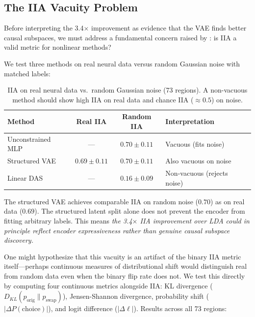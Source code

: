 \documentclass{article}
\begin{document}
\subsection{The IIA Vacuity Problem}
\label{sec:vacuity}

Before interpreting the 3.4$\times$ improvement as evidence that the VAE finds better causal subspaces, we must address a fundamental concern raised by \citet{sutter2025iia}: is IIA a valid metric for nonlinear methods?

We test three methods on real neural data versus random Gaussian noise with matched labels:

\begin{table}[h]
\centering
\small
\caption{IIA on real neural data vs.\ random Gaussian noise (73 regions). A non-vacuous method should show high IIA on real data and chance IIA ($\approx 0.5$) on noise.}
\label{tab:sutter}
\begin{tabular}{lccl}
\toprule
Method & Real IIA & Random IIA & Interpretation \\
\midrule
Unconstrained MLP & --- & $0.70 \pm 0.11$ & Vacuous (fits noise) \\
Structured VAE & $0.69 \pm 0.11$ & $0.70 \pm 0.11$ & Also vacuous on noise \\
Linear DAS & --- & $0.16 \pm 0.09$ & Non-vacuous (rejects noise) \\
\bottomrule
\end{tabular}
\end{table}

The structured VAE achieves comparable IIA on random noise ($0.70$) as on real data ($0.69$). The structured latent split alone does not prevent the encoder from fitting arbitrary labels. This means \emph{the 3.4$\times$ IIA improvement over LDA could in principle reflect encoder expressiveness rather than genuine causal subspace discovery.}

One might hypothesize that this vacuity is an artifact of the binary IIA metric itself---perhaps continuous measures of distributional shift would distinguish real from random data even when the binary flip rate does not. We test this directly by computing four continuous metrics alongside IIA: KL divergence ($D_{KL}(p_{\text{orig}} \| p_{\text{swap}})$), Jensen-Shannon divergence, probability shift ($|\Delta P(\text{choice})|$), and logit difference ($|\Delta \ell|$). Results across all 73 regions:
\end{document}
